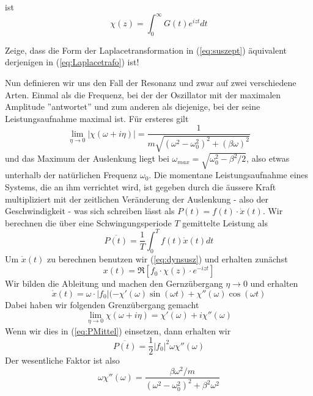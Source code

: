 ist
\begin{equation}\label{eq:suszept}
\chi(z) = \int_0^\infty G(t)e^{izt}dt
\end{equation}
\begin{note}{}
Zeige, dass die Form der Laplacetransformation in (\ref{eq:suszept}) äquivalent
derjenigen in (\ref{eq:Laplacetrafo}) ist!
\end{note}
Nun definieren wir uns den Fall der Resonanz und zwar auf zwei verschiedene
Arten. Einmal als die Frequenz, bei der der Oszillator mit der maximalen
Amplitude ''antwortet'' und zum anderen als diejenige, bei der seine
Leistungsaufnahme maximal ist. Für ersteres gilt
\begin{equation}\label{eq:ampres}
\lim_{\eta\rightarrow 0}|\chi(\omega +i\eta)|=
\frac{1}{m\sqrt{(\omega^2-\omega_0^2)^2+(\beta\omega)^2}}
\end{equation}
und das Maximum der Auslenkung liegt bei
$\omega_{max}=\sqrt{\omega_0^2-\beta^2/2}$, also etwas unterhalb der
natürlichen Frequenz $\omega_0$. Die momentane Leistungsaufnahme eines Systems,
die an ihm verrichtet wird, ist gegeben durch die äussere Kraft multipliziert
mit der zeitlichen Veränderung der Auslenkung - also der Geschwindigkeit - was
sich schreiben lässt als $P(t)=f(t)\cdot\dot{x}(t)$. Wir berechnen die über
eine Schwingungsperiode $T$ gemittelte Leistung als
\begin{equation}\label{eq:PMittel}
\overline{P(t)}=\frac{1}{T}\int_0^T f(t)\dot{x}(t)dt
\end{equation}
Um $\dot{x}(t)$ zu berechnen benutzen wir (\ref{eq:dynsusz}) und erhalten
zunächst 
\[x(t)=\Re [f_0\cdot\chi(z)\cdot e^{-izt}]\] 
Wir bilden die Ableitung und machen
den Gernzübergang $\eta\rightarrow 0$ und erhalten 
\begin{equation}\label{eq:xdot}
\dot{x}(t)=\omega\cdot |f_0|(-\chi'(\omega)\sin(\omega t)+\chi''(\omega)\cos(\omega t)
\end{equation}
Dabei haben wir folgenden Grenzübergang gemacht
\[ 
\lim_{\eta\rightarrow 0}\chi(\omega+i\eta)=\chi'(\omega)+i\chi''(\omega)
\]
Wenn wir dies in (\ref{eq:PMittel}) einsetzen, dann erhalten wir 
\begin{equation}\label{eq:PMittelChi}
\overline{P(t)}=\frac{1}{2}|f_0|^2\omega\chi''(\omega)
\end{equation}
Der wesentliche Faktor ist also
\begin{equation}\label{eq:PMittelFactor}
\omega\chi''(\omega)=\frac{\beta\omega^2/m}{(\omega^2-\omega_0^2)^2+\beta^2\omega^2}
\end{equation}
